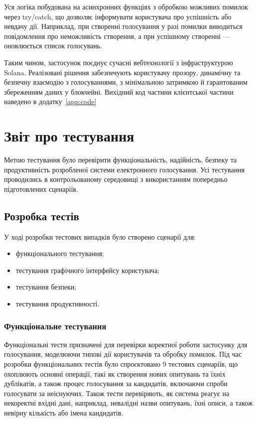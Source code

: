 \documentclass[14pt]{extreport}
\begin{document}
  Уся логіка побудована на асинхронних функціях з обробкою можливих помилок через try/catch, що дозволяє інформувати користувача про успішність або невдачу дії. Наприклад, при створенні голосування у разі помилки виводиться повідомлення про неможливість створення, а при успішному створенні — оновлюється список голосувань.

  Таким чином, застосунок поєднує сучасні вебтехнології з інфраструктурою Solana. Реалізовані рішення забезпечують користувачу прозору, динамічну та безпечну взаємодію з голосуваннями, з мінімальною затримкою й гарантованим збереженням даних у блокчейні.  Вихідний код частини клієнтської частини наведено в додатку~\ref{app:code}
    
  \section{Звіт про тестування}
  
  Метою тестування було перевірити функціональність, надійність, безпеку та продуктивність розробленої системи електронного голосування. Усі тестування проводились в контрольованому середовищі з використанням попередньо підготовлених сценаріїв.
  
  \subsection{Розробка тестів}
  
  У ході розробки тестових випадків було створено сценарії для:
  
  \begin{itemize}
    \item функціонального тестування;
    \item тестування графічного інтерфейсу користувача;
    \item тестування безпеки;
    \item тестування продуктивності.
  \end{itemize}
  
  \subsubsection{Функціональне тестування}
  
  Функціональні тести призначені для перевірки коректної роботи застосунку для голосування, моделюючи типові дії користувачів та обробку помилок. Під час розробки функціональних тестів було спроєктовано 9 тестових сценаріїв, що охоплюють основні операції, такі як створення нових опитувань та їхніх дублікатів, а також процес голосування за кандидатів, включаючи спроби голосувати за неіснуючих. Також тести перевіряють, як система реагує на некоректні вхідні дані, наприклад, невалідні назви опитувань, їхні описи, а також невірну кількість або імена кандидатів.
  
\end{document}
